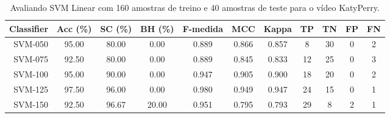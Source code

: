 \begin{table}[!htb]
\centering
\caption{Avaliando SVM Linear com 160 amostras de treino e 40 amostras de teste para o vídeo KatyPerry.}
\label{tab:linear-svm-KatyPerry}
\begin{tabular}{r|c|c|c|c|c|c|c|c|c|c}
\hline\hline
Classifier & Acc (\%) & SC (\%) & BH (\%) & F-medida & MCC & Kappa & TP & TN & FP & FN \\ \hline
SVM-050 & 95.00 & 80.00 & 0.00 & 0.889 & 0.866 & 0.857 & 8 & 30 & 0 & 2 \\ 
SVM-075 & 92.50 & 80.00 & 0.00 & 0.889 & 0.845 & 0.833 & 12 & 25 & 0 & 3 \\ 
SVM-100 & 95.00 & 90.00 & 0.00 & 0.947 & 0.905 & 0.900 & 18 & 20 & 0 & 2 \\ 
SVM-125 & 97.50 & 96.00 & 0.00 & 0.980 & 0.949 & 0.947 & 24 & 15 & 0 & 1 \\ 
SVM-150 & 92.50 & 96.67 & 20.00 & 0.951 & 0.795 & 0.793 & 29 & 8 & 2 & 1 \\ 
\hline\hline
\end{tabular}
\end{table}
